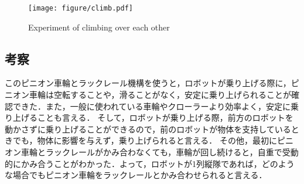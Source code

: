 \begin{figure}[tb]
  \centering
  \texttt{[image: figure/climb.pdf]}
  \caption{Experiment of climbing over each other}
  \label{fig:climb}
\end{figure}

\subsection{考察}
このピニオン車輪とラックレール機構を使うと，ロボットが乗り上げる際に，ピニオン車輪は空転することや，滑ることがなく，安定に乗り上げられることが確認できた．また，一般に使われている車輪やクローラーより効率よく，安定に乗り上げることも言える．
そして，ロボットが乗り上げる際，前方のロボットを動かさずに乗り上げることができるので，前のロボットが物体を支持しているときでも，物体に影響を与えず，乗り上げられると言える．
その他，最初にピニオン車輪とラックレールがかみ合わなくても，車輪が回し続けると，自重で受動的にかみ合うことがわかった．よって，ロボットが1列縦隊であれば，どのような場合でもピニオン車輪をラックレールとかみ合わせられると言える．

